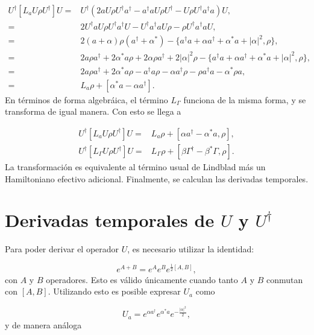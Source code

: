 \documentclass[a4paper,10pt]{report}
\begin{document}
\begin{align*}
U^\dagger [L_aU\rho U^\dagger]U =& U^\dagger(2aU\rho U^\dagger a^\dagger - a^\dagger a U\rho U^\dagger - U\rho U^\dagger a^\dagger a)U,\\
=& 2U^\dagger a U \rho U^\dagger a^\dagger U - U^\dagger a^\dagger a U \rho -\rho U^\dagger a^\dagger a U, \\
=& 2(a+\alpha)\rho(a^\dagger+\alpha^*)-\{a^\dagger a +\alpha a^\dagger + \alpha^* a + |\alpha|^2,\rho \},\\
=& 2a\rho a^\dagger + 2\alpha^* a\rho +2\alpha \rho a^\dagger + 2|\alpha|^2\rho -\{a^\dagger a +\alpha a^\dagger + \alpha^* a + |\alpha|^2,\rho \},\\
=& 2a\rho a^\dagger + 2\alpha^* a\rho - a^\dagger a \rho -\alpha a^\dagger \rho -\rho a^\dagger a -\alpha^* \rho a,\\
=& L_a\rho + [\alpha^* a - \alpha a^\dagger].
\end{align*} En términos de forma algebráica, el término $L_\Gamma$ funciona de la misma forma, y se transforma de igual manera. Con esto se llega a

\begin{align}
U^\dagger [L_aU\rho U^\dagger]U=& L_a\rho + [\alpha a^\dagger - \alpha^* a,\rho],\\
U^\dagger [L_\Gamma U\rho U^\dagger]U =& L_\Gamma \rho + [ \beta \Gamma^\dagger - \beta^* \Gamma,\rho].
\end{align} La transformación es equivalente al término usual de Lindblad más un Hamiltoniano efectivo adicional. Finalmente, se calculan las derivadas temporales.

\section{Derivadas temporales de $U$ y $U^\dagger$}

Para poder derivar el operador $U$, es necesario utilizar la identidad:

\begin{equation}
e^{A+B} = e^A e^B e^{\frac{1}{2}[A,B]},
\end{equation} con $A$ y $B$ operadores. Esto es válido únicamente cuando tanto $A$ y $B$ conmutan con $[A,B]$. Utilizando esto es posible expresar $U_a$ como

\begin{equation}
U_a = e^{\alpha a^\dagger}e^{\alpha^* a}e^{-\frac{|\alpha|^2}{2}},
\end{equation} y de manera análoga
\end{document}
